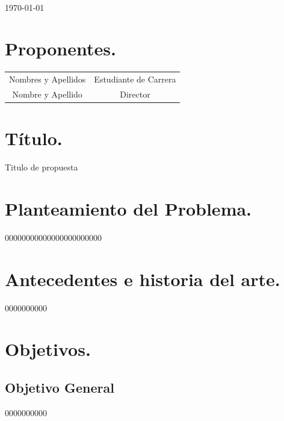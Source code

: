 \documentclass[10pt]{article}
\begin{document}
\begin{center}
 		\\																		%
\vspace{2cm} 																				
\begin{center}																					
{\large \today}																	%
 			\end{center}												  						
\end{center}							 											
																					
\newpage																		

\tableofcontents 

\newpage

\section{Proponentes.}

\begin{tabular}{cc}
Nombres y Apellidos & \parbox[t]{20cm}{Estudiante de Carrera}\\
Nombre y Apellido & \parbox[t]{20cm}{Director }
\end{tabular}




\section{Título.} 

Titulo de propuesta



\section{Planteamiento del Problema.}
00000000000000000000000
\section{Antecedentes e historia del arte.}
0000000000



\section{Objetivos.}
\subsection{Objetivo General}
0000000000
\end{document}
